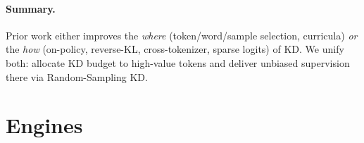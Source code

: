 \documentclass[11pt]{article}
\begin{document}
\paragraph{Summary.} Prior work either improves the \emph{where} (token/word/sample selection, curricula) \emph{or} the \emph{how} (on-policy, reverse-KL, cross-tokenizer, sparse logits) of KD. We unify both: allocate KD budget to high-value tokens and deliver unbiased supervision there via Random-Sampling KD.




\section{Engines}
\end{document}
